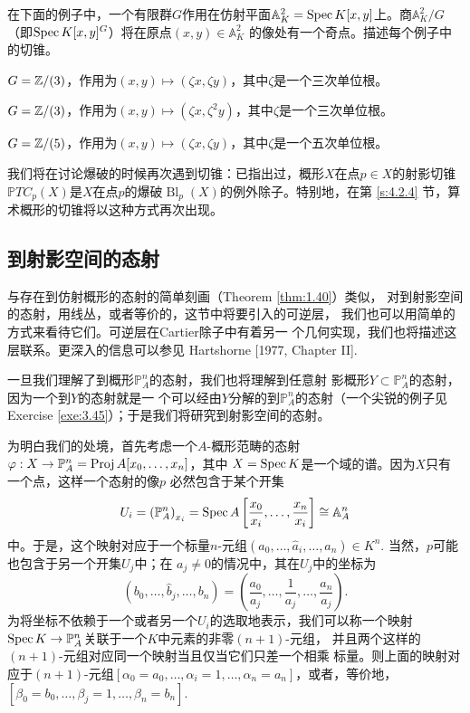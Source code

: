 \begin{exe}\label{exe:3.35}
在下面的例子中，一个有限群$G$作用在仿射平面$\mathbb A^2_K=\operatorname{Spec} K[x,y]$上。商$\mathbb A_K^2/G$（即$\operatorname{Spec} K[x,y]^G$）将在原点$(x,y)\in \mathbb A_K^2$ %
的像处有一个奇点。描述每个例子中的切锥。
\begin{compactenum}[(a)]
\item $G=\mathbb{Z}/(3)$，作用为$(x,y)\mapsto (\zeta x,\zeta y)$，其中$\zeta$是一个三次单位根。
\item $G=\mathbb{Z}/(3)$，作用为$(x,y)\mapsto (\zeta x,\zeta^2 y)$，其中$\zeta$是一个三次单位根。
\item $G=\mathbb{Z}/(5)$，作用为$(x,y)\mapsto (\zeta x,\zeta y)$，其中$\zeta$是一个五次单位根。
\end{compactenum}
\end{exe}

我们将在讨论爆破的时候再次遇到切锥：已指出过，概形$X$在点$p\in X$的射影切锥$\mathbb PTC_p(X)$是$X$在点$p$的爆破$\operatorname{Bl}_p(X)$的例外除子。特别地，在第 \ref{s:4.2.4} 节，算术概形的切锥将以这种方式再次出现。

\subsection{到射影空间的态射} \label{s:3.2.5}

与存在到仿射概形的态射的简单刻画（Theorem \ref{thm:1.40}）类似，
对到射影空间的态射，用线丛，或者等价的，这节中将要引入的可逆层，
我们也可以用简单的方式来看待它们。可逆层在Cartier除子中有着另一
个几何实现，我们也将描述这层联系。更深入的信息可以参见
Hartshorne [1977, Chapter II].

一旦我们理解了到概形$\mathbb P_A^n$的态射，我们也将理解到任意射  
影概形$Y\subset \mathbb P_A^n$的态射，因为一个到$Y$的态射就是一
个可以经由$Y$分解的到$\mathbb P_A^n$的态射（一个尖锐的例子见
Exercise \ref{exe:3.45}）；于是我们将研究到射影空间的态射。

为明白我们的处境，首先考虑一个$A$-概形范畴的态射
$\varphi:X\to \mathbb P^n_A=\operatorname{Proj} A[x_0,\dots,x_n]$，其中
$X=\operatorname{Spec} K$是一个域的谱。因为$X$只有一个点，这样一个态射的像$p$
必然包含于某个开集
\[
	U_i=\left(\mathbb P_A^n\right)_{x_i}=\operatorname{Spec} A\left[
	\frac{x_0}{x_i},\dots,\frac{x_n}{x_i}\right]\cong \mathbb A_A^n
\]
中。于是，这个映射对应于一个标量$n$-元组$(a_0,\dots,\hat a_i,
\dots,a_n)\in K^n$. 当然，$p$可能也包含于另一个开集$U_j$中；在
$a_j\neq 0$的情况中，其在$U_j$中的坐标为
\[
	(b_0,\dots,\hat b_j,\dots,b_n)=\left(
	\frac{a_0}{a_j},\dots,\frac{1}{a_j},\dots,\frac{a_n}{a_j}
	\right).
\]
为将坐标不依赖于一个或者另一个$U_i$的选取地表示，我们可以称一个映射
$\operatorname{Spec} K\to \mathbb P_A^n$关联于一个$K$中元素的非零$(n+1)$-元组，
并且两个这样的$(n+1)$-元组对应同一个映射当且仅当它们只差一个相乘
标量。则上面的映射对应于$(n+1)$-元组$[\alpha_0=a_0,\dots,\alpha_i
=1,\dots,\alpha_n=a_n]$，或者，等价地，$[\beta_0=b_0,\dots,
\beta_j=1,\dots,\beta_n=b_n]$.

